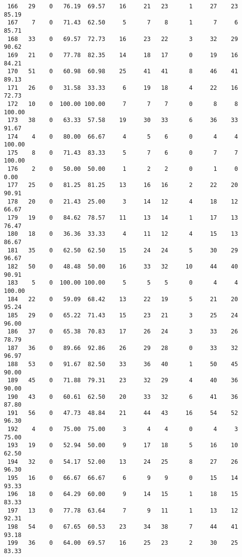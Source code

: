 \begin{verbatim}
 166   29    0   76.19  69.57    16     21   23      1     27    23    85.19
 167    7    0   71.43  62.50     5      7    8      1      7     6    85.71
 168   33    0   69.57  72.73    16     23   22      3     32    29    90.62
 169   21    0   77.78  82.35    14     18   17      0     19    16    84.21
 170   51    0   60.98  60.98    25     41   41      8     46    41    89.13
 171   26    0   31.58  33.33     6     19   18      4     22    16    72.73
 172   10    0  100.00 100.00     7      7    7      0      8     8   100.00
 173   38    0   63.33  57.58    19     30   33      6     36    33    91.67
 174    4    0   80.00  66.67     4      5    6      0      4     4   100.00
 175    8    0   71.43  83.33     5      7    6      0      7     7   100.00
 176    2    0   50.00  50.00     1      2    2      0      1     0     0.00
 177   25    0   81.25  81.25    13     16   16      2     22    20    90.91
 178   20    0   21.43  25.00     3     14   12      4     18    12    66.67
 179   19    0   84.62  78.57    11     13   14      1     17    13    76.47
 180   18    0   36.36  33.33     4     11   12      4     15    13    86.67
 181   35    0   62.50  62.50    15     24   24      5     30    29    96.67
 182   50    0   48.48  50.00    16     33   32     10     44    40    90.91
 183    5    0  100.00 100.00     5      5    5      0      4     4   100.00
 184   22    0   59.09  68.42    13     22   19      5     21    20    95.24
 185   29    0   65.22  71.43    15     23   21      3     25    24    96.00
 186   37    0   65.38  70.83    17     26   24      3     33    26    78.79
 187   36    0   89.66  92.86    26     29   28      0     33    32    96.97
 188   53    0   91.67  82.50    33     36   40      1     50    45    90.00
 189   45    0   71.88  79.31    23     32   29      4     40    36    90.00
 190   43    0   60.61  62.50    20     33   32      6     41    36    87.80
 191   56    0   47.73  48.84    21     44   43     16     54    52    96.30
 192    4    0   75.00  75.00     3      4    4      0      4     3    75.00
 193   19    0   52.94  50.00     9     17   18      5     16    10    62.50
 194   32    0   54.17  52.00    13     24   25      8     27    26    96.30
 195   16    0   66.67  66.67     6      9    9      0     15    14    93.33
 196   18    0   64.29  60.00     9     14   15      1     18    15    83.33
 197   13    0   77.78  63.64     7      9   11      1     13    12    92.31
 198   54    0   67.65  60.53    23     34   38      7     44    41    93.18
 199   36    0   64.00  69.57    16     25   23      2     30    25    83.33

\end{verbatim}

